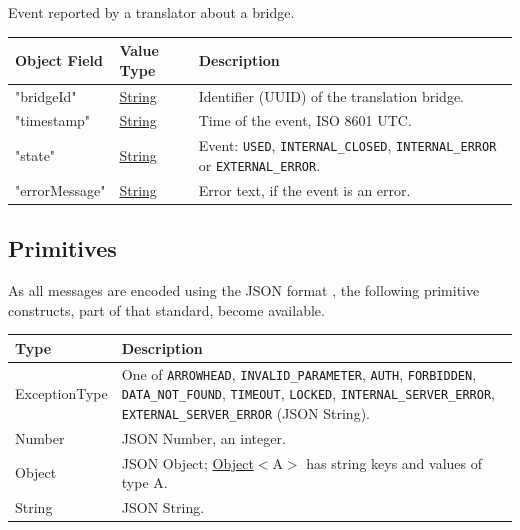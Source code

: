 \documentclass[a4paper]{arrowhead}
\newcommand{\pdef}[1]{{\textcolor{ArrowheadGrey}{#1 \label{sec:model:primitives:#1} \label{sec:model:primitives:#1s}}}}
\newcommand{\pref}[1]{{\textcolor{ArrowheadGrey}{\hyperref[sec:model:primitives:#1]{#1}}}}
\begin{document}

Event reported by a translator about a bridge.


\noindent\begin{tabularx}{\textwidth}{| >{\raggedright\arraybackslash}p{3.9cm} | >{\raggedright\arraybackslash\small}p{5.3cm} | X |} \hline
\rowcolor{gray!33} Object Field & Value Type & Description \\ \hline
"bridge\allowbreak{}Id" & \pref{String} & Identifier (UUID) of the translation bridge. \\ \hline
"timestamp" & \pref{String} & Time of the event, ISO 8601 UTC. \\ \hline
"state" & \pref{String} & Event: \texttt{USED}, \texttt{INTERNAL\_\allowbreak{}CLOSED}, \texttt{INTERNAL\_\allowbreak{}ERROR} or \texttt{EXTERNAL\_\allowbreak{}ERROR}. \\ \hline
"error\allowbreak{}Message" & \pref{String} & Error text, if the event is an error. \\ \hline
\end{tabularx}



\subsection{Primitives}
\label{sec:model:primitives}

As all messages are encoded using the JSON format \cite{rfc8259}, the following primitive constructs, part of that standard, become available.

\noindent\begin{tabularx}{\textwidth}{| p{4.6cm} | X |} \hline
\rowcolor{gray!33} Type & Description \\ \hline
\pdef{ExceptionType} & One of \texttt{ARROWHEAD}, \texttt{INVALID\_\allowbreak{}PARAMETER}, \texttt{AUTH}, \texttt{FORBIDDEN}, \texttt{DATA\_\allowbreak{}NOT\_\allowbreak{}FOUND}, \texttt{TIMEOUT}, \texttt{LOCKED}, \texttt{INTERNAL\_\allowbreak{}SERVER\_\allowbreak{}ERROR}, \texttt{EXTERNAL\_\allowbreak{}SERVER\_\allowbreak{}ERROR} (JSON String). \\ \hline
\pdef{Number} & JSON Number, an integer. \\ \hline
\pdef{Object} & JSON Object; \pref{Object}$<$A$>$ has string keys and values of type A. \\ \hline
\pdef{String} & JSON String. \\ \hline
\end{tabularx}
\end{document}
